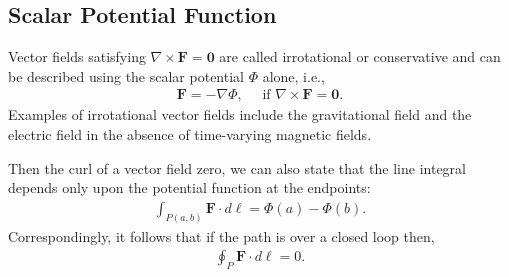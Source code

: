 \subsection{Scalar Potential Function}

Vector fields satisfying $\nabla \times \mathbf{F} = \mathbf{0}$ are called irrotational or conservative and can be described using the scalar potential $\Phi$ alone, i.e.,
\begin{align}
  \mathbf{F} = -\nabla \Phi, \quad \text{ if } \nabla \times \mathbf{F} = \mathbf{0}.
\end{align}
Examples of irrotational vector fields include the gravitational field and the electric field in the absence of time-varying magnetic fields. 

Then the curl of a vector field zero, we can also state that the line integral depends only upon the potential function at the endpoints:
\begin{align}
  \int_{P(a,b)} \mathbf{F} \cdot d\boldsymbol\ell = \Phi(a) - \Phi(b) .
\end{align}
Correspondingly, it follows that if the path is over a closed loop then,
\begin{align}
  \oint_{P} \mathbf{F} \cdot d\boldsymbol\ell = 0 .
\end{align}

